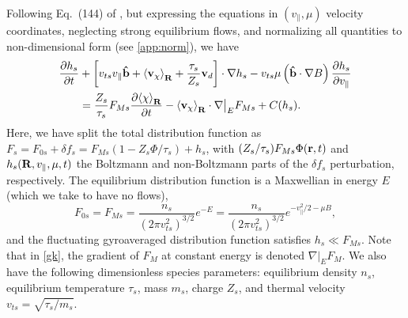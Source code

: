 \documentclass{jpp}
\renewcommand{\vec}[1]{\ensuremath{\mbox{$ {\bf #1} $}}} %
\begin{document}
Following Eq.~(144) of \cite{Abel2013}, but expressing the equations in $(v_\parallel,\mu)$ velocity coordinates, neglecting strong equilibrium flows, and normalizing all quantities to non-dimensional form (see \cref{app:norm}), we have
\begin{align}
\frac{\partial h_s}{\partial t} & + \left[v_{ts} v_\parallel {\bf \hat{b}} + \langle{  {\bf v}_{\chi} \rangle}_{\bf R} +
                  \frac{\tau_s}{Z_s}{\bf v}_d \right] \cdot \nabla h_s - v_{ts} \mu \left({\bf \hat{b}}\cdot\nabla B\right) \frac{\partial h_s}{\partial v_\parallel}
                  \notag \\ &=
                 \frac{Z_s}{\tau_s}F_{Ms} \frac{\partial \langle{ \chi \rangle}_{\bf R}}{\partial t} - \langle{  {\bf v}_{\chi} \rangle}_{\bf R} \cdot \nabla\big|_E F_{Ms} + C(h_s).
\label{gk}
\end{align}
Here, we have split the total distribution function as $F_s = F_{0s} + \delta\!f_s = F_{Ms}(1-Z_s\Phi/\tau_s)+h_s$, with $(Z_s/\tau_s) F_{Ms} \Phi({\bf r},t)$ and $h_s(\vec{R},v_\parallel,\mu,t)$ the Boltzmann and non-Boltzmann parts of the $\delta\!f_s$ perturbation, respectively. 
{\color{black} The equilibrium distribution function is a Maxwellian in energy $E$ (which we take to have no flows),
\begin{equation}
F_{0s} = F_{Ms}  = 
\frac{n_s}{(2\pi v_{ts}^2)^{3/2}}e^{-E} = 
\frac{n_s}{(2\pi v_{ts}^2)^{3/2}}e^{-v_\parallel^2/2- \mu B},
\end{equation}
and the fluctuating gyroaveraged distribution function satisfies
$h_s\ll F_{Ms}$. Note that in \cref{gk}, the gradient of $F_M$ at constant energy is denoted $\nabla\big|_E F_M$. We also have the following dimensionless species
parameters: equilibrium density $n_s$, equilibrium temperature
$\tau_s$, mass $m_s$, charge $Z_s$, and thermal velocity
$v_{ts}=\sqrt{\tau_s/m_s}$.}
\end{document}
